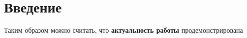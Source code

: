\section{Введение}

Таким образом можно считать, что \textbf{актуальность работы} продемонстрирована